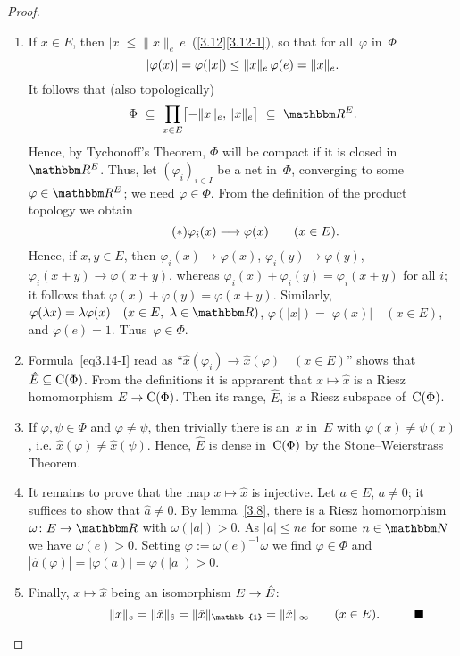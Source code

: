 \documentclass[main.tex]{subfiles}
\begin{document}
\begin{proof}
\begin{enumerate}[label=(\Roman*)]
\item \label{3.14-I}
If $x\in E$, then $|x|\leq \| x\|_e\, e$\ 
 (\ref{3.12}\ref{3.12-1}),
so that for all~$\varphi$ in~$\Phi$
\begin{equation*}
|\varphi(x)|=\varphi(|x|)\leq \|x\|_e\, \varphi(e)=\|x\|_e\text{.}
\end{equation*}
It follows that (also topologically)
\begin{equation*}
\Phi 
\ \subseteq  \ 
\prod_{x\in E} \bigl[-\| x \|_e , \|x \|_e \bigr] 
\ \subseteq \ \R^E\htam{.}
\end{equation*}
Hence,
by Tychonoff's Theorem,
$\Phi$ will be compact if it is closed in~$\R^E$.
Thus, let $(\varphi_i)_{i\in I}$
be a net in~$\Phi$,
converging to some $\varphi\in\R^E$;
we need $\varphi\in\Phi$.
From the definition of the product topology we obtain
\begin{equation}
\label{eq3.14-I} \tag{$*$}
\varphi_i(x) \longrightarrow \varphi(x) \qquad (x\in E)\text{.}
\end{equation}
Hence, 
if $x,y\in E$,
then $\varphi_i(x)\rightarrow \varphi(x)$,
$\varphi_i(y)\rightarrow \varphi(y)$,
$\varphi_i(x+y)\rightarrow \varphi(x+y)$,
whereas $\varphi_i(x)+\varphi_i(y)=\varphi_i(x+y)$ for all $i$;
it follows that $\varphi(x)+\varphi(y) = \varphi(x+y)$.
Similarly, $\varphi(\lambda x)=\lambda \varphi(x)
\quad (x\in E,\ \lambda\in \R)$,
$\varphi(|x|)=|\varphi(x)|\quad(x\in E)$,
and $\varphi(e)=1$.
Thus~$\varphi\in\Phi$.
%
\item \label{3.14-II}
Formula~\eqref{eq3.14-I} 
read as ``$\hat{x}(\varphi_i)\rightarrow\hat{x}(\varphi)\quad (x\in E)$''
shows that $\hat{E}\subseteq\mathrm{C}(\Phi)$.
From the definitions it is apprarent that $x\mapsto\hat{x}$
is a Riesz homomorphism $E\rightarrow\mathrm{C}(\Phi)$.
Then its range, $\hat{E}$, 
is a Riesz subspace of~$\mathrm{C}(\Phi)$.
%
\item \label{3.14-III}
If $\varphi,\psi\in\Phi$ and $\varphi\neq\psi$,
then trivially there is an~$x$ in~$E$ with $\varphi(x)\neq\psi(x)$,
i.e. $\hat{x}(\varphi) \neq\hat{x}(\psi)$.
Hence, $\hat{E}$ is dense in~$\mathrm{C}(\Phi)$ by the 
Stone--Weierstrass Theorem.
%
\item \label{3.14-IV}
It remains to prove that the map $x\mapsto \hat{x}$
is injective.
Let $a\in E$, $a\neq 0$;
it suffices to show that $\hat{a}\neq 0$.
By lemma~\ref{3.8},
there is a Riesz homomorphism $\omega\colon E\ra \R$
with $\omega(|a|)>0$.
As $|a|\leq ne$ for some $n\in \N$
we have $\omega(e)>0$.
Setting $\varphi:=\omega(e)^{-1} \omega$
we find $\varphi\in \Phi$ 
and $|\hat{a}(\varphi)| = |\varphi(a)| = \varphi(|a|)>0$.
%
\item \label{3.14-V}
Finally,
$x\mapsto \hat{x}$
being an isomorphism $E\rightarrow \hat{E}$:
\begin{equation*}
\|x\|_e = \|\hat{x}\|_{\hat{e}} = \|\hat{x}\|_\mathbb{1} 
= \|\hat{x}\|_\infty\qquad (x\in E)\mathrlap{\htam{. \qquad \xqed}}
\end{equation*}
\end{enumerate}
\end{proof}
\end{document}
